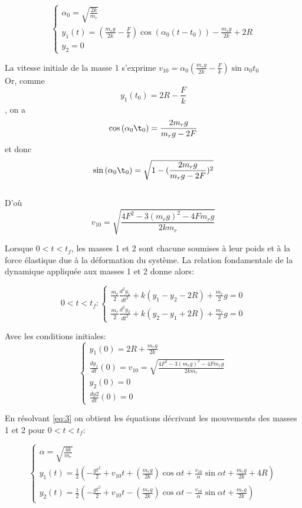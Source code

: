 \begin{equation}
  \begin{cases}
    \alpha_0=\sqrt{\frac{2k}{m_r}}\\
    y_1(t)=(\frac{m_r g}{2k}-\frac{F}{k})\cos(\alpha_0(t-t_0))-\frac{m_r g}{2k}+2R \\
    y_2=0
  \end{cases}
  \label{eq:2}
\end{equation}

La vitesse initiale de la masse 1 s'exprime $v_{10}=\alpha_0(\frac{m_r g}{2k}-\frac{F}{k})\sin{\alpha_0 t_0}$ \\

Or, comme $$y_1(t_0)=2R-\frac{F}{k}$$, on a $$\cos{(\alpha_0 \t_0)}=\frac{2m_rg}{m_rg-2F}$$ et donc $$\sin{(\alpha_0 \t_0)}=\sqrt{1-(\frac{2m_rg}{m_rg-2F})^2}$$ \\
D'où $$v_{10}=\sqrt{\frac{4F^2 -3(m_r g)^2-4Fm_rg}{2 k m_r}}$$

Lorsque $0<t<t_f$, les masses 1 et 2 sont chacune soumises à leur poids et à la force élastique due à la déformation du système.
La relation fondamentale de la dynamique appliquée aux masses 1 et 2 donne alors:

\begin{equation}
   0<t<t_f: 
  \begin{cases}
    \frac{m_r}{2}\frac{d^2y_1}{dt^2}+k(y_1-y_2-2R)+\frac{m_r}{2}g=0\\
    \frac{m_r}{2}\frac{d^2y_2}{dt^2}+k(y_2-y_1+2R)+\frac{m_r}{2}g=0
  \end{cases}
  \label{eq:3}
\end{equation}

Avec les conditions initiales: 
\begin{equation}
  \begin{cases}
    y_1(0)=2R+\frac{m_r g}{2k}\\
    \frac{d y_1}{dt}(0)=v_{10}=\sqrt{\frac{4F^2 -3(m_r g)^2-4Fm_rg}{2 k m_r}}\\
    y_2(0)=0 \\
    \frac{d y2}{dt}(0)=0
  \end{cases}
  \label{eq:4}
\end{equation}

En résolvant \ref{eq:3} on obtient les équations décrivant les mouvements des masses 1 et 2 pour $0<t<t_f$:

\begin{equation}
  \begin{cases}
    \alpha=\sqrt{\frac{4k}{m_r}}\\
    y_1(t)=\frac{1}{2}(-\frac{g t^2}{2}+v_{10}t+(\frac{m_r g}{2k})\cos{\alpha t}+\frac{v_{10}}{\alpha}\sin{\alpha t}+\frac{m_r g}{2k}+4R) \\
    y_2(t)=\frac{1}{2}(-\frac{g t^2}{2}+v_{10}t-(\frac{m_r g}{2k})\cos{\alpha t}-\frac{v_{10}}{\alpha}\sin{\alpha t}+\frac{m_r g}{2k}) 
  \end{cases}
  \label{eq:5}
\end{equation}

